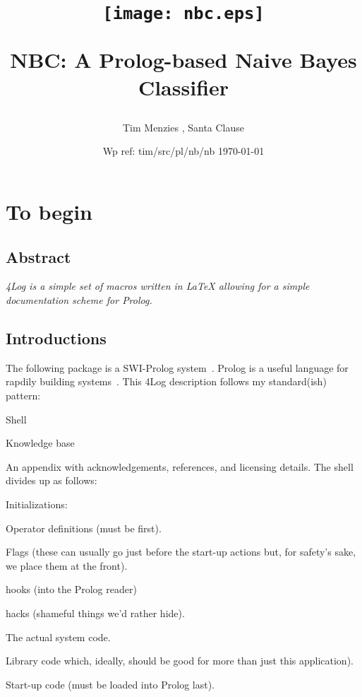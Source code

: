 \documentclass[twocolumn,10pt]{book}
\date{Wp ref: tim/src/pl/nb/nb \today}
\newcommand{\ME}{NBC}
\begin{document}
\thispagestyle{plain}
\pagestyle{fancy}
\title{
\begin{minipage}{.2\linewidth}
\texttt{[image: nbc.eps]}\end{minipage}\hfill
\begin{minipage}{.75\linewidth}
\ME: A Prolog-based Naive Bayes Classifier
\end{minipage}}
\author{Tim Menzies%
             , Santa Clause%
             }
\thispagestyle{empty}
\maketitle
\pagestyle{fancy}
\setcounter{tocdepth}{4}
\tableofcontents \listoffigures
\thispagestyle{plain}
\pagestyle{fancy}
\chapter{To begin}
 \section*{Abstract}
{\em {\Tex4Log} is a simple set of macros written in {\LaTeX}
allowing for a simple documentation scheme for Prolog.}




\section{ Introductions
}
 The following package is a SWI-Prolog system~\cite{swiprolog}.
Prolog is a useful language for rapdily building
systems~\cite{der96,me89zb,bratko01,ok90,sterling94}.
This {\Tex4Log}
description  follows my standard(ish) pattern:
\bi
\item
Shell
\item Knowledge base
\item
An appendix with acknowledgements, references, and licensing details.
\ei
The shell divides up as follows:
\bi
\item Initializations:
\bi
\item
Operator definitions (must be first).
\item
Flags (these can usually go just before the start-up
actions but, for safety's sake, we place them at the
front).
\item
hooks (into the Prolog reader)
\item
hacks (shameful things we'd rather hide).
\ei
\item
The actual system code.
\item
Library code which, ideally,
should be good for more than just this application).
\item
Start-up code (must be loaded into Prolog last).
\ei
\end{document}
